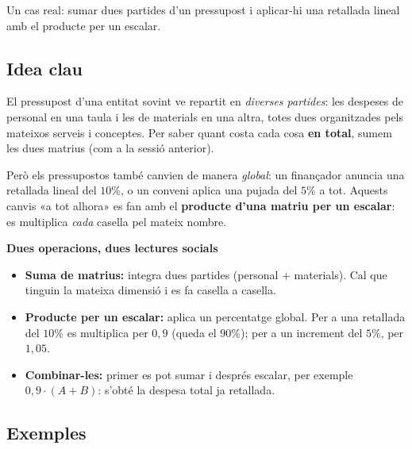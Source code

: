 %
{Un cas real: sumar dues partides d'un pressupost i aplicar-hi una retallada lineal amb el producte per un escalar.}

\subsection{Idea clau}

El pressupost d'una entitat sovint ve repartit en \emph{diverses partides}: les
despeses de personal en una taula i les de materials en una altra, totes dues
organitzades pels mateixos serveis i conceptes. Per saber quant costa cada cosa
\textbf{en total}, sumem les dues matrius (com a la sessió anterior).

Però els pressupostos també canvien de manera \emph{global}: un finançador
anuncia una retallada lineal del $10\%$, o un conveni aplica una pujada del $5\%$
a tot. Aquests canvis «a tot alhora» es fan amb el \textbf{producte d'una matriu
per un escalar}: es multiplica \emph{cada} casella pel mateix nombre.

\begin{idea}
\textbf{Dues operacions, dues lectures socials}
\begin{itemize}[leftmargin=1.4em, itemsep=2pt]
  \item \textbf{Suma de matrius:} integra dues partides (personal $+$ materials).
        Cal que tinguin la mateixa dimensió i es fa casella a casella.
  \item \textbf{Producte per un escalar:} aplica un percentatge global. Per a una
        retallada del $10\%$ es multiplica per $0{,}9$ (queda el $90\%$); per a un
        increment del $5\%$, per $1{,}05$.
  \item \textbf{Combinar-les:} primer es pot sumar i després escalar, per exemple
        $0{,}9\cdot(A+B)$: s'obté la despesa total ja retallada.
\end{itemize}
\end{idea}

\subsection{Exemples}


